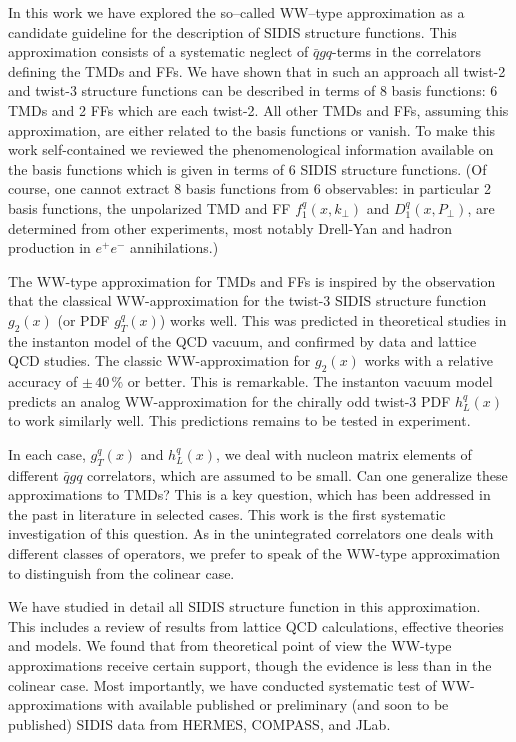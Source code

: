 \documentclass[a4paper,11pt]{article}
\def\kperp{k_\perp}
\def\pperp{P_\perp}
\begin{document}
In this work we have explored the so--called WW--type approximation
as a candidate guideline for the description of SIDIS structure
functions. This approximation consists of a systematic neglect 
of $\bar qgq$-terms in the
correlators defining the TMDs and FFs. We have shown that in such
an approach all twist-2 and twist-3 structure functions can be
described in terms of 8 basis functions: 6 TMDs and 2 FFs
which are each twist-2. All other TMDs and FFs, assuming this
approximation, are either related to the basis functions or
vanish. To make this work self-contained
we reviewed the phenomenological information available
on the basis functions which is given in terms of 6 SIDIS
structure functions. (Of course, one cannot extract 8 basis
functions from 6 observables: in particular 2 basis functions,
the unpolarized TMD and FF $f_1^q(x,\kperp)$ and $D_1^q(x,\pperp)$,
are determined from other experiments, most notably Drell-Yan
and hadron production in $e^+e^-$ annihilations.)

The WW-type approximation for TMDs and FFs is inspired by the
observation that the classical WW-approximation for the twist-3
SIDIS structure function $g_2(x)$ (or PDF $g_T^q(x)$) works well. 
This was predicted in theoretical studies in the instanton model 
of the QCD vacuum, and confirmed by data and lattice QCD studies.
The classic WW-approximation for $g_2(x)$ works with a relative
accuracy of $\pm\,40\,\%$ or better. This is remarkable.
The instanton vacuum model predicts an analog WW-approximation
for the chirally odd twist-3 PDF $h_L^q(x)$ to work similarly
well. This predictions remains to be tested in experiment.

In each case, $g_T^q(x)$ and $h_L^q(x)$, we deal with nucleon
matrix elements of different $\bar qgq$ correlators, which are 
assumed to be small. Can one generalize these approximations to
TMDs? This is a key question, which has been addressed in the
past in literature in selected cases. This work is the first
systematic investigation of this question.
As in the unintegrated correlators one deals with different
classes of operators, we prefer to speak of the
WW-type approximation to distinguish from the colinear case.

We have studied in detail all SIDIS structure function in 
this approximation. This includes a review of results from 
lattice QCD calculations, effective theories and models.
We found that from theoretical point of view the WW-type
approximations receive certain support, though the 
evidence is less than in the colinear case.
Most importantly, we have conducted systematic test of
WW-approximations with available published or 
preliminary (and soon to be published) SIDIS data
from HERMES, COMPASS, and JLab.
\end{document}

